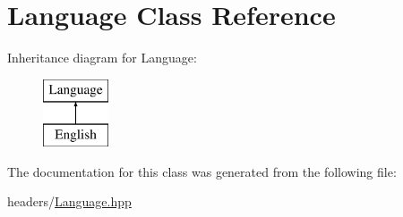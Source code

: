 \hypertarget{classLanguage}{}\section{Language Class Reference}
\label{classLanguage}
Inheritance diagram for Language\+:\begin{figure}[H]
\begin{center}
\leavevmode
\includegraphics[height=2.000000cm]{classLanguage}
\end{center}
\end{figure}


The documentation for this class was generated from the following file\+:\begin{DoxyCompactItemize}
\item 
headers/\hyperlink{Language_8hpp}{Language.\+hpp}\end{DoxyCompactItemize}
